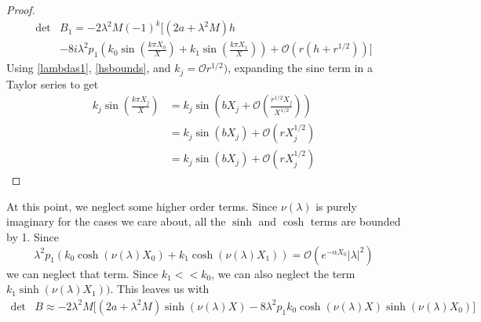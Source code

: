 \documentclass[thesis.tex]{subfiles}
\begin{document}
\begin{lemma}
\begin{proof}
\begin{align*}
\det &B_1 = -2 \lambda^2 M (-1)^k \Big[ (2a + \lambda^2 M) h \\
&- 8 i \lambda^2 p_1 \left( k_0 \sin\left(\frac{k \pi X_0}{X}\right) + k_1 \sin\left(\frac{k \pi X_1}{X}\right) \right) + \mathcal{O}(r(h + r^{1/2}))\Big] 
\end{align*}
Using \cref{lambdas1}, \cref{hsbounds}, and $k_j = \mathcal{O}r^{1/2})$, expanding the sine term in a Taylor series to get
\begin{align*}
k_j \sin\left( \frac{k \pi X_j}{X}\right) 
&= k_j \sin\left( b X_j + \mathcal{O}\left( \frac{r^{1/2}X_j }{X^{1/2}} \right) \right) \\
&= k_j \sin(b X_j) + \mathcal{O}\left(r X_j^{1/2} \right) \\
&= k_j \sin(b X_j) + \mathcal{O}\left(r X_j^{1/2} \right)
\end{align*}
\end{proof}
\end{lemma}

At this point, we neglect some higher order terms. Since $\nu(\lambda)$ is purely imaginary for the cases we care about, all the $\sinh$ and $\cosh$ terms are bounded by 1. Since 
\[
\lambda^2 p_1(k_0 \cosh(\nu(\lambda)X_0) + k_1 \cosh(\nu(\lambda)X_1)  ) = \mathcal{O}(e^{-\alpha X_0}|\lambda|^2)
\]
we can neglect that term. Since $k_1 << k_0$, we can also neglect the term $k_1 \sinh(\nu(\lambda)X_1) )$. This leaves us with 
\begin{align*}
\det &B \approx -2 \lambda^2 M \Big[ (2a + \lambda^2 M  ) \sinh(\nu(\lambda)X) - 8 \lambda^2 p_1 k_0 \cosh(\nu(\lambda)X) \sinh(\nu(\lambda)X_0) \Big]
\end{align*}
\end{document}
